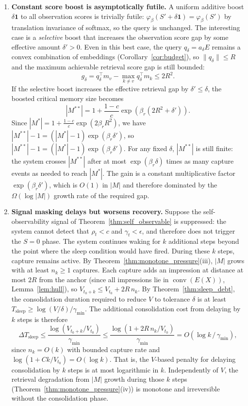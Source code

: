\begin{theorem}
\begin{enumerate}
\item \textbf{Constant score boost is asymptotically futile.}  A uniform additive boost $\delta\mathbf{1}$ to all observation scores is trivially futile: $\varphi_\beta(S' + \delta\mathbf{1}) = \varphi_\beta(S')$ by translation invariance of softmax, so the query is unchanged.  The interesting case is a \emph{selective} boost that increases the observation score gap by some effective amount $\delta' > 0$.  Even in this best case, the query $q_{\delta} = a_\delta E$ remains a convex combination of embeddings (Corollary~\ref{cor:budget}), so $\|q_\delta\| \leq R$ and the maximum achievable retrieval score gap is still bounded:
\[
g_\delta = q_\delta^\top m_v - \max_{k \neq v} q_\delta^\top m_k \leq 2R^2.
\]
If the selective boost increases the effective retrieval gap by $\delta' \leq \delta$, the boosted critical memory size becomes
\[
|M^{**}| = 1 + \frac{1-c}{c}\exp(\beta_r(2R^2 + \delta')).
\]
Since $|M^*| = 1 + \frac{1-c}{c}\exp(2\beta_r R^2)$, we have $|M^{**}| - 1 = (|M^*| - 1)\exp(\beta_r\delta')$, so $|M^{**}| - 1 = (|M^*| - 1)\exp(\beta_r\delta')$.  For any fixed $\delta$, $|M^{**}|$ is still finite: the system crosses $|M^{**}|$ after at most $\exp(\beta_r\delta)$ times as many capture events as needed to reach $|M^*|$.  The gain is a constant multiplicative factor $\exp(\beta_r\delta')$, which is $O(1)$ in $|M|$ and therefore dominated by the $\Omega(\log|M|)$ growth rate of the required gap.

\item \textbf{Signal masking delays but worsens recovery.}  Suppose the self-observability signal of Theorem~\ref{thm:self_observable} is suppressed: the system cannot detect that $\rho_t < c$ and $\gamma_t < \epsilon$, and therefore does not trigger the $S = 0$ phase.  The system continues waking for $k$ additional steps beyond the point where the sleep condition would have fired.  During these $k$ steps, capture remains active.  By Theorem~\ref{thm:monotone_pressure}(iii), $|M|$ grows with at least $n_k \geq 1$ captures.  Each capture adds an impression at distance at most $2R$ from the anchor (since all impressions lie in $\operatorname{conv}(E(X))$, Lemma~\ref{lem:hull}), so $V_{t_0+k} \leq V_{t_0} + 2R\,n_k$.  By Theorem~\ref{thm:sleep_debt}, the consolidation duration required to reduce $V$ to tolerance $\delta$ is at least $T_{\mathrm{sleep}} \geq \log(V/\delta)/\gamma_{\min}$.  The additional consolidation cost from delaying by $k$ steps is therefore
\[
\Delta T_{\mathrm{sleep}} \leq \frac{\log(V_{t_0+k}/V_{t_0})}{\gamma_{\min}} \leq \frac{\log(1 + 2R\,n_k/V_{t_0})}{\gamma_{\min}} = O(\log k\,/\,\gamma_{\min}),
\]
since $n_k = O(k)$ with bounded capture rate and $\log(1 + Ck/V_{t_0}) = O(\log k)$.  That is, the $V$-based penalty for delaying consolidation by $k$ steps is at most logarithmic in $k$.  Independently of $V$, the retrieval degradation from $|M|$ growth during those $k$ steps (Theorem~\ref{thm:monotone_pressure}(iv)) is monotone and irreversible without the consolidation phase.


\end{enumerate}
\end{theorem}
